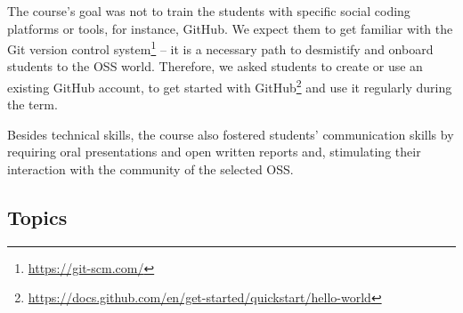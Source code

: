 \documentclass[sigconf]{acmart}
\begin{document}
The course's goal was not to train the students with specific social coding platforms or tools, for instance, GitHub.
We expect them to get familiar with the Git version control system\footnote{\url{https://git-scm.com/}} -- it is a necessary path to 
desmistify and onboard students to the OSS world.
Therefore,  we asked students to create or use an existing GitHub account, 
to get started with GitHub\footnote{\url{https://docs.github.com/en/get-started/quickstart/hello-world}} and use it regularly during the term.

Besides technical skills, the course also fostered students' communication skills
by requiring oral presentations and open written reports and, stimulating their interaction with the community of the selected OSS.



 
\subsection{Topics}
\label{syllabus}


\end{document}
